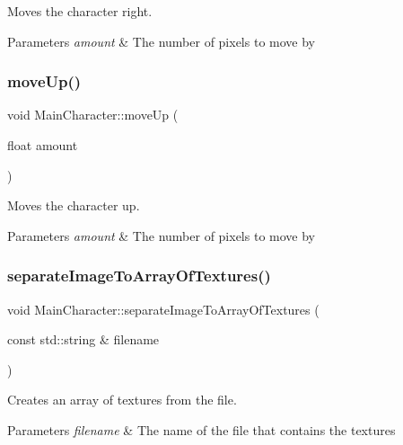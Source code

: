 Moves the character right. 


\begin{DoxyParams}{Parameters}
{\em amount} & The number of pixels to move by \\
\hline
\end{DoxyParams}
\mbox{\label{classMainCharacter_a3de845aca47feb0ef968a03316c781bf}} 
\subsubsection{\texorpdfstring{moveUp()}{moveUp()}}
{\footnotesize\ttfamily void Main\+Character\+::move\+Up (\begin{DoxyParamCaption}\item[{float}]{amount }\end{DoxyParamCaption})}



Moves the character up. 


\begin{DoxyParams}{Parameters}
{\em amount} & The number of pixels to move by \\
\hline
\end{DoxyParams}
\mbox{\label{classMainCharacter_accfd0235b5f57d38be77643e979c893d}} 
\subsubsection{\texorpdfstring{separateImageToArrayOfTextures()}{separateImageToArrayOfTextures()}}
{\footnotesize\ttfamily void Main\+Character\+::separate\+Image\+To\+Array\+Of\+Textures (\begin{DoxyParamCaption}\item[{const std\+::string \&}]{filename }\end{DoxyParamCaption})}



Creates an array of textures from the file. 


\begin{DoxyParams}{Parameters}
{\em filename} & The name of the file that contains the textures \\
\hline
\end{DoxyParams}
\mbox{\label{classMainCharacter_a557d59154e4d12af391ee5d218b7dcc8}} 
